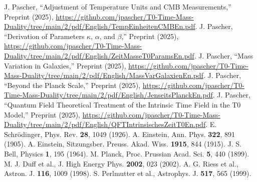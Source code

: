 \documentclass[aps,prl,twocolumn,superscriptaddress,nofootinbib]{revtex4-2}
\begin{document}
\begin{thebibliography}{99}
		 J. Pascher, ``Adjustment of Temperature Units and CMB Measurements,'' Preprint (2025), \url{https://github.com/jpascher/T0-Time-Mass-Duality/tree/main/2/pdf/English/TempEinheitenCMBEn.pdf}.
		 J. Pascher, ``Derivation of Parameters $\kappa$, $\alpha$, and $\beta$,'' Preprint (2025), \url{https://github.com/jpascher/T0-Time-Mass-Duality/tree/main/2/pdf/English/ZeitMasseT0ParamsEn.pdf}.
		 J. Pascher, ``Mass Variation in Galaxies,'' Preprint (2025), \url{https://github.com/jpascher/T0-Time-Mass-Duality/tree/main/2/pdf/English/MassVarGalaxienEn.pdf}.
		 J. Pascher, ``Beyond the Planck Scale,'' Preprint (2025), \url{https://github.com/jpascher/T0-Time-Mass-Duality/tree/main/2/pdf/English/JenseitsPlanckEn.pdf}.
		 J. Pascher, ``Quantum Field Theoretical Treatment of the Intrinsic Time Field in the T0 Model,'' Preprint (2025), \url{https://github.com/jpascher/T0-Time-Mass-Duality/tree/main/2/pdf/English/QFTIntrinsischesZeitT0En.pdf}.
		 E. Schrödinger, Phys. Rev. \textbf{28}, 1049 (1926).
		 A. Einstein, Ann. Phys. \textbf{322}, 891 (1905).
		 A. Einstein, Sitzungsber. Preuss. Akad. Wiss. \textbf{1915}, 844 (1915).
		 J. S. Bell, Physics \textbf{1}, 195 (1964).
		 M. Planck, Proc. Prussian Acad. Sci. \textbf{5}, 440 (1899).
		 M. J. Duff et al., J. High Energy Phys. \textbf{2002}, 023 (2002).
		 A. G. Riess et al., Astron. J. \textbf{116}, 1009 (1998).
		 S. Perlmutter et al., Astrophys. J. \textbf{517}, 565 (1999).
	\end{thebibliography}
	
\end{document}
